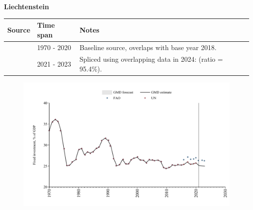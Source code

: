 \documentclass[12pt,a4paper,landscape]{article}
\begin{document}
\begin{adjustbox}{max totalsize={\paperwidth}{\paperheight},center}
\begin{minipage}[t][\textheight][t]{\textwidth}
\vspace*{0.5cm}
{}
\begin{center}
{\Large\bfseries Liechtenstein}
\end{center}
\vspace{0.5cm}
\begin{table}[H]
\centering
\small
\begin{tabular}{|l|l|l|}
\hline
\textbf{Source} & \textbf{Time span} & \textbf{Notes} \\
\hline
\rowcolor{white}\cite{UN}& 1970 - 2020 &Baseline source, overlaps with base year 2018.\\
\rowcolor{lightgray}\cite{FAO}& 2021 - 2023 &Spliced using overlapping data in 2024: (ratio = 95.4\%).\\
\hline
\end{tabular}
\end{table}
\begin{figure}[H]
\centering
\includegraphics[width=\textwidth,height=0.6\textheight,keepaspectratio]{graphs/LIE_finv_GDP.pdf}
\end{figure}
\end{minipage}
\end{adjustbox}
\end{document}
